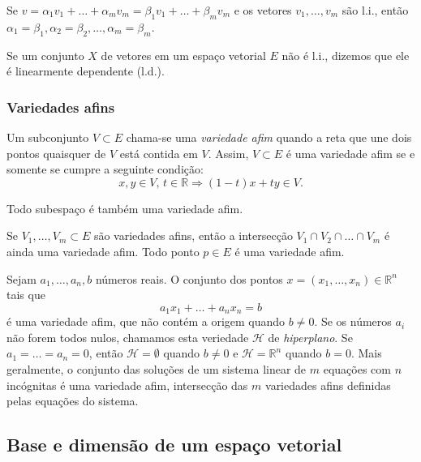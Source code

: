 \begin{teo}
  Se $v=\alpha_1v_1+\ldots+\alpha_mv_m = \beta_1v_1+\ldots+\beta_mv_m$ e os vetores $v_1,\ldots,v_m$ são l.i., então $\alpha_1=\beta_1, \alpha_2=\beta_2, \ldots, \alpha_m=\beta_m$.
\end{teo}

Se um conjunto $X$ de vetores em um espaço vetorial $E$ não é l.i., dizemos que ele é linearmente dependente (l.d.).

\subsubsection*{Variedades afins}

\begin{defi}
  Um subconjunto $V\subset E$ chama-se uma \emph{variedade afim} quando a reta que une dois pontos quaisquer de $V$ está contida em $V$. Assim, $V\subset E$ é uma variedade afim se e somente se cumpre a seguinte condição:
  \begin{equation*}
    x,y \in V, \, t \in {\mathbb{R}} \Rightarrow (1-t)x + ty \in V.
  \end{equation*}
\end{defi}

\begin{exemplo}
  Todo subespaço é também uma variedade afim.
\end{exemplo}

Se $V_1,\ldots, V_m \subset E$ são variedades afins, então a intersecção $V_1 \cap V_2\cap \ldots \cap V_m$ é ainda uma variedade afim. Todo ponto $p\in E$ é uma variedade afim.

\begin{exemplo}
  Sejam $a_1,\ldots, a_n, b$ números reais. O conjunto dos pontos $x=(x_1,\ldots,x_n)\in {\mathbb{R}}^n$ tais que 
  \begin{equation*}
    a_1x_1+\ldots+a_nx_n=b
  \end{equation*}
  é uma variedade afim, que não contém a origem quando $b \ne 0$. Se os números $a_i$ não forem todos nulos, chamamos esta veriedade ${\mathcal{H}}$ de \emph{hiperplano}. Se $a_1=\ldots=a_n=0$, então ${\mathcal{H}}=\emptyset$ quando $b\ne 0 $ e ${\mathcal{H}}={\mathbb{R}}^n$ quando $b=0$. Mais geralmente, o conjunto das soluções de um sistema linear de $m$ equações com $n$ incógnitas é uma variedade afim, intersecção das $m$ variedades afins definidas pelas equações do sistema.
\end{exemplo}

\subsection{Base e dimensão de um espaço vetorial}

